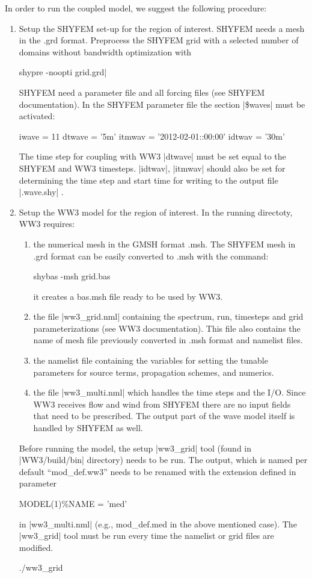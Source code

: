 In order to run the coupled model, we suggest the following
procedure:
\begin{enumerate}
\item Setup the SHYFEM set-up for the region of interest. 
SHYFEM needs a mesh in the .grd format. Preprocess the SHYFEM grid with a selected number of domains 
without bandwidth optimization with
\begin{code}
shypre -noopti grid.grd|
\end{code}
SHYFEM need a parameter file and all forcing files (see SHYFEM documentation). In the SHYFEM 
parameter file the section |\$waves| must be activated:
\begin{code}
        iwave  = 11             dtwave = '5m'
        itmwav = '2012-02-01::00:00'    idtwav = '30m'
\end{code}
The time step for coupling with WW3 |dtwave| must be set equal
to the SHYFEM and WW3 timesteps.
|idtwav|, |itmwav| should also be set for determining the 
time step and start time for writing to the output file |.wave.shy| .

\item Setup the WW3 model for the region of interest. In the
running directoty, WW3 requires:
\begin{enumerate}
\item the numerical mesh in the GMSH format .msh. The SHYFEM
mesh in .grd format can be easily converted to .msh with the command:
\begin{code}
shybas -msh grid.bas
\end{code}
it creates a bas.msh file ready to be used by WW3.
\item the file |ww3_grid.nml| containing the spectrum, run, timesteps
and grid parameterizations (see WW3 documentation). This file also
contains the name of mesh file previously converted in .msh format and
namelist files.
\item the namelist file containing the variables for setting
the tunable parameters for source terms, propagation schemes, and 
numerics.
\item the file |ww3_multi.nml| which handles the time steps and 
the I/O. Since WW3 receives flow and wind from SHYFEM there are 
no input fields that need to be prescribed. The output part of the 
wave model itself is handled by SHYFEM as well.
\end{enumerate}

Before running the model, the setup |ww3_grid| tool (found in |WW3/build/bin|
directory) needs to be run. The output, 
which is named per default ``mod\_def.ww3'' needs to be renamed 
with the extension defined in parameter
\begin{code}
MODEL(1)\%NAME = 'med'
\end{code}
in |ww3_multi.nml| (e.g., mod\_def.med in the above mentioned case). 
The |ww3_grid| tool must be run every time the namelist or grid files 
are modified. 
\begin{code}
./ww3_grid
\end{code}


\end{enumerate}
